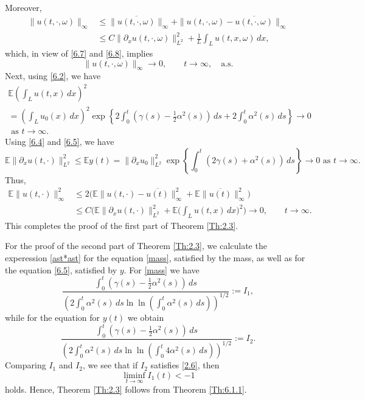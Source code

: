 \documentclass[a4paper,12pt]{article}
\numberwithin{equation}{section}
\def\d{\partial}
\begin{document}
Moreover, 
\begin{align*}
\|u(t,\cdot,\omega)\|_\infty
&\le \|\overline{u(t, \cdot, \omega)}\|_{\infty}
+ \|u(t,\cdot, \omega)-\overline{u(t, \cdot, \omega)}\|_\infty \nonumber\\
&\le C\|\d_x u(t, \cdot, \omega)\|_{L^2}^2
+ \frac{1}{L}
\int_L u(t,x,\omega)\,dx,
\end{align*}
which, in view of \eqref{6.7} and \eqref{6.8}, implies
\[
\|u(t,\cdot,\omega)\|_\infty \to 0,
\qquad t\to\infty,
\quad \text{a.s.}
\]
Next, using \eqref{6.2}, we have
\begin{multline*} \label{6.9}
\mathbb{E}\!\left(\int_L u(t,x)\,dx\right)^2
\\
=
\left(\int_L u_0(x)\,dx\right)^2
\exp\left\{
2\int_0^t \left(\gamma(s)-\frac12\alpha^2(s)\right)\,ds
+ 2\int_0^t \alpha^2(s)\,ds
\right\} \to 0 \\
\text{ as } t \to \infty.
\end{multline*}
Using \eqref{6.4} and \eqref{6.5}, we have
\begin{equation}\label{6.10}
\mathbb{E}\|\d_x u(t, \cdot)\|_{L^2}^2
\le \mathbb{E}y(t)
= \|\d_x u_0\|_{L^2}^2
\exp\left\{
\int_0^t (2 \gamma(s) + \alpha^2(s)) \,ds
\right\} \to 0 \text{ as } t \to \infty.
\end{equation}
Thus,
\begin{align*}
\mathbb{E}\|u(t, \cdot)\|_\infty^2
&\le 2\Big(
\mathbb{E}\|u(t, \cdot)-\overline{u(t)}\|_\infty^2
+ \mathbb{E}\|\overline{u(t)}\|_{\infty}^2
\Big) \nonumber\\
&\le C\Big(
\mathbb{E}\|\d_x u(t, \cdot)\|_{L^2}^2
+ \mathbb{E}\Big(\int_L u(t,x)\,dx\Big)^2
\Big)
\to 0,
\qquad t\to\infty.
\end{align*}
This completes the proof of the first part of Theorem \ref{Th:2.3}.

\bigskip

For the proof of the second part of Theorem \ref{Th:2.3},  we calculate the experession \eqref{ast*ast} for the equation \eqref{mass}, satisfied by the mass, as well as for the equation \eqref{6.5}, satisfied by $y$.  
For \eqref{mass} we have
\begin{equation*}\label{6.11}
\frac{
\displaystyle
\int_0^t \left(\gamma(s)-\frac12\alpha^2(s)\right)\,ds
}{
\displaystyle
\left(
2\int_0^t \alpha^2(s)\,ds
\ln\ln\!\left(\int_0^t \alpha^2(s)\,ds\right)
\right)^{1/2}
}
:= I_1,
\end{equation*}
while for the equation for $y(t)$ we obtain
\begin{equation*}\label{6.12}
\frac{
\displaystyle
\int_0^t \left(\gamma(s)-\frac12\alpha^2(s)\right)\,ds
}{
\displaystyle
\left(
2\int_0^t \alpha^2(s)\,ds
\ln\ln\!\left(\int_0^t 4 \alpha^2(s)\,ds\right)
\right)^{1/2}
}
:= I_2.
\end{equation*}
Comparing $I_1$ and $I_2$, we see that if $I_2$ satisfies \eqref{2.6}, then
\[
\liminf_{t\to\infty} I_1(t) < -1
\]
holds. Hence,  Theorem \ref{Th:2.3} follows from Theorem \ref{Th:6.1.1}.
\end{document}
